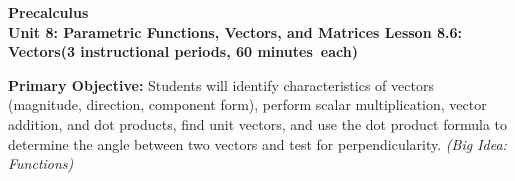 \documentclass[10pt]{article}
\newcommand{\CourseName}{Precalculus}
\newcommand{\MeetingLength}{60 minutes}
\newcommand{\UnitNumberName}{Unit 8: Parametric Functions, Vectors, and Matrices \quad}
\newcommand{\LessonNumberName}{Lesson 8.6: Vectors}
\begin{document}
\begin{center}
  {\Large\bfseries \CourseName} \\[4pt]
  {\small\bfseries \UnitNumberName \LessonNumberName \quad (3 instructional periods, \MeetingLength\ each)}
\end{center}

\begin{tcolorbox}[colback=sky, colframe=navy, boxrule=0.9pt, arc=2mm,
    left=2mm, right=2mm, top=1.5mm, bottom=1.5mm]
  \textbf{Primary Objective:} Students will identify characteristics of vectors
  (magnitude, direction, component form), perform scalar multiplication, vector
  addition, and dot products, find unit vectors, and use the dot product formula
  to determine the angle between two vectors and test for perpendicularity.
  \textit{(Big Idea: Functions)}
\end{tcolorbox}

\vspace{0.08in}
\end{document}
